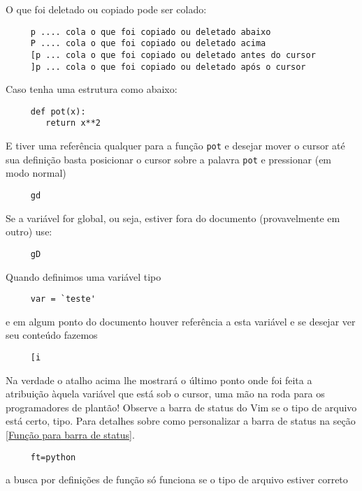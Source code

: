 O que foi deletado ou copiado pode ser colado:

\begin{verbatim}
     p .... cola o que foi copiado ou deletado abaixo
     P .... cola o que foi copiado ou deletado acima
     [p ... cola o que foi copiado ou deletado antes do cursor
     ]p ... cola o que foi copiado ou deletado após o cursor
\end{verbatim}

Caso tenha uma estrutura como abaixo:

\begin{verbatim}
     def pot(x):
        return x**2
\end{verbatim}

E tiver uma referência qualquer para a função \verb+pot+ e desejar
mover o cursor até sua definição basta posicionar o cursor sobre a palavra
\verb+pot+ e pressionar (em modo normal)

\begin{verbatim}
     gd
\end{verbatim}

Se a variável for global, ou seja, estiver fora do documento
(provavelmente em outro) use:

\begin{verbatim}
     gD
\end{verbatim}

Quando definimos uma variável tipo

\begin{verbatim}
     var = `teste'
\end{verbatim}

e em algum ponto do documento houver referência a esta variável e se
desejar ver seu conteúdo fazemos

\begin{verbatim}
     [i
\end{verbatim}

Na verdade o atalho acima lhe mostrará o último ponto onde foi feita a
atribuição àquela variável que está sob o cursor, uma mão na roda para os
programadores de plantão!  {\Large {}} Observe a  barra de status do
Vim se o tipo de arquivo está certo, tipo. Para detalhes sobre como
personalizar a barra de status na seção \ref{Função para barra de status}.

\begin{verbatim}
     ft=python
\end{verbatim}

a busca por definições de função só funciona se o tipo de arquivo
estiver correto

